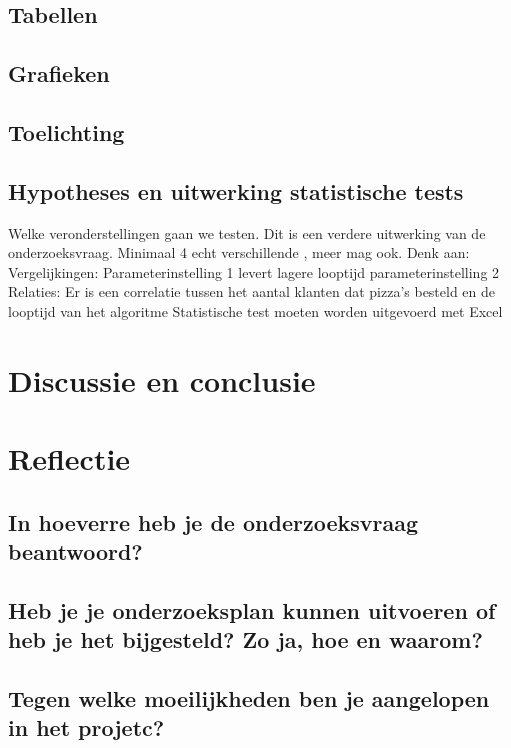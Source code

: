 \documentclass{article}
\begin{document}
\subsection{Tabellen}
\subsection{Grafieken}
\subsection{Toelichting}
\subsection{Hypotheses en uitwerking statistische tests}
 Welke veronderstellingen gaan we testen. Dit is een verdere uitwerking van de onderzoeksvraag. Minimaal 4 echt verschillende , meer mag ook. Denk aan:
Vergelijkingen: Parameterinstelling 1 levert lagere looptijd parameterinstelling 2 Relaties: Er is een correlatie tussen het aantal klanten dat pizza's besteld en de looptijd van het algoritme
Statistische test moeten worden uitgevoerd met Excel
\section{Discussie en conclusie}
\section{Reflectie}
\subsection{In hoeverre heb je de onderzoeksvraag beantwoord?}
\subsection{Heb je je onderzoeksplan kunnen uitvoeren of heb je het bijgesteld? Zo ja, hoe en waarom?}
\subsection{Tegen welke moeilijkheden ben je aangelopen in het projetc?}
\end{document}
